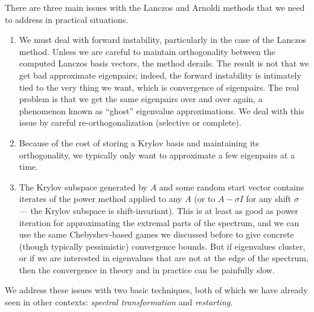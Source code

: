 There are three main issues with the Lanczos and Arnoldi methods
that we need to address in practical situations.
\begin{enumerate}
\item
  We must deal with forward instability, particularly in the case of the
  Lanczos method.  Unless we are careful to maintain orthogonality
  between the computed Lanczos basis vectors, the method derails.  The
  result is not that we get bad approximate eigenpairs; indeed, the
  forward instability is intimately tied to the very thing we want,
  which is convergence of eigenpairs.  The real problem is that we get
  the same eigenpairs over and over again, a phenomenon known as
  ``ghost'' eigenvalue approximations.  We deal with this issue by
  careful re-orthogonalization (selective or complete).
\item
  Because of the cost of storing a Krylov basis and maintaining its
  orthogonality, we typically only want to approximate a few eigenpairs
  at a time.
\item
  The Krylov subspace generated by $A$ and some random start
  vector contains iterates of the power method applied to any $A$
  (or to $A-\sigma I$ for any shift $\sigma$ --- the Krylov subspace
  is shift-invariant).  This is at least as good as power iteration
  for approximating the extremal parts of the spectrum, and we can
  use the same Chebyshev-based games we discussed before to
  give concrete (though typically pessimistic) convergence bounds.  But if
  eigenvalues cluster, or if we are interested in eigenvalues that
  are not at the edge of the spectrum, then the convergence in theory
  and in practice can be painfully slow.
\end{enumerate}
We address these issues with two basic techniques, both of which
we have already seen in other contexts: {\em spectral transformation}
and {\em restarting}.
